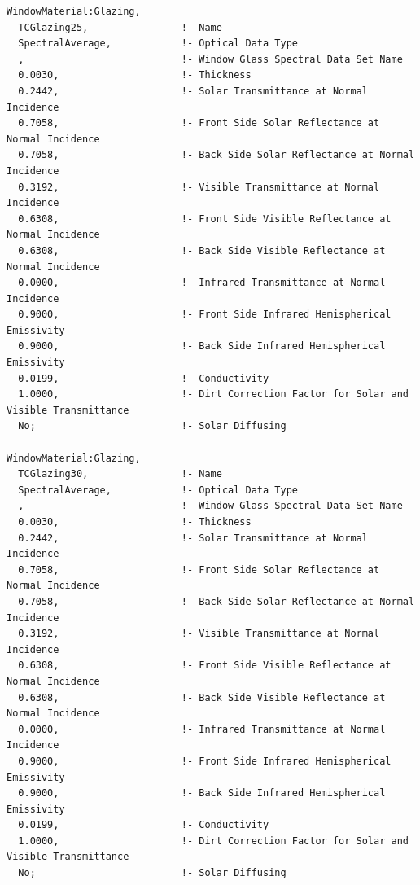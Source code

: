 \begin{lstlisting}
WindowMaterial:Glazing,
  TCGlazing25,                !- Name
  SpectralAverage,            !- Optical Data Type
  ,                           !- Window Glass Spectral Data Set Name
  0.0030,                     !- Thickness
  0.2442,                     !- Solar Transmittance at Normal Incidence
  0.7058,                     !- Front Side Solar Reflectance at Normal Incidence
  0.7058,                     !- Back Side Solar Reflectance at Normal Incidence
  0.3192,                     !- Visible Transmittance at Normal Incidence
  0.6308,                     !- Front Side Visible Reflectance at Normal Incidence
  0.6308,                     !- Back Side Visible Reflectance at Normal Incidence
  0.0000,                     !- Infrared Transmittance at Normal Incidence
  0.9000,                     !- Front Side Infrared Hemispherical Emissivity
  0.9000,                     !- Back Side Infrared Hemispherical Emissivity
  0.0199,                     !- Conductivity
  1.0000,                     !- Dirt Correction Factor for Solar and Visible Transmittance
  No;                         !- Solar Diffusing

WindowMaterial:Glazing,
  TCGlazing30,                !- Name
  SpectralAverage,            !- Optical Data Type
  ,                           !- Window Glass Spectral Data Set Name
  0.0030,                     !- Thickness
  0.2442,                     !- Solar Transmittance at Normal Incidence
  0.7058,                     !- Front Side Solar Reflectance at Normal Incidence
  0.7058,                     !- Back Side Solar Reflectance at Normal Incidence
  0.3192,                     !- Visible Transmittance at Normal Incidence
  0.6308,                     !- Front Side Visible Reflectance at Normal Incidence
  0.6308,                     !- Back Side Visible Reflectance at Normal Incidence
  0.0000,                     !- Infrared Transmittance at Normal Incidence
  0.9000,                     !- Front Side Infrared Hemispherical Emissivity
  0.9000,                     !- Back Side Infrared Hemispherical Emissivity
  0.0199,                     !- Conductivity
  1.0000,                     !- Dirt Correction Factor for Solar and Visible Transmittance
  No;                         !- Solar Diffusing


\end{lstlisting}
